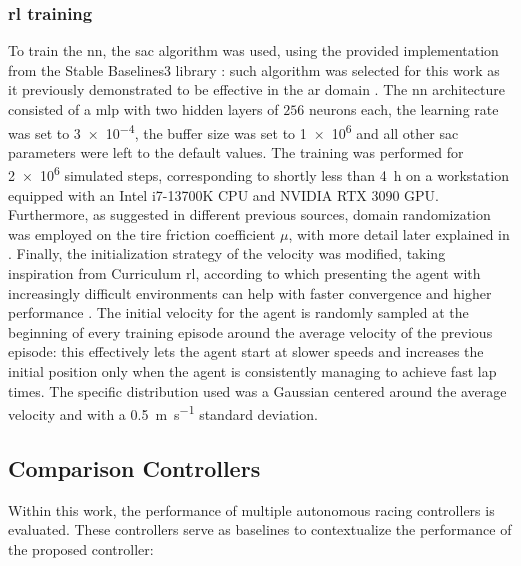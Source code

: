 \documentclass[letterpaper, conference]{IEEEtran}
\begin{document}
\subsubsection{\acrshort{rl} training}
To train the \gls{nn}, the \gls{sac} algorithm \cite{sac} was used, using the provided implementation from the Stable Baselines3 library \cite{stable-baselines3}: such algorithm was selected for this work as it previously demonstrated to be effective in the \gls{ar} domain \cite{chisari2021learning, Ghignone2023tcdriver}. 
The \gls{nn} architecture consisted of a \gls{mlp} with two hidden layers of $256$ neurons each, the learning rate was set to \num{3e-4}, the buffer size was set to \num{1e6} and all other \gls{sac} parameters were left to the default values. The training was performed for \num{2e6} simulated steps, corresponding to shortly less than \SI{4}{\hour} on a workstation equipped with an Intel i7-13700K CPU and NVIDIA RTX 3090 GPU. 
Furthermore, as suggested in different previous sources, domain randomization was employed on the tire friction coefficient $\mu$, with more detail later explained in .
Finally, the initialization strategy of the velocity was modified, taking inspiration from Curriculum \gls{rl}, according to which presenting the agent with increasingly difficult environments can help with faster convergence and higher performance \cite{song2021overtaking, rudin2022learning}.
The initial velocity for the agent is randomly sampled at the beginning of every training episode around the average velocity of the previous episode: this effectively lets the agent start at slower speeds and increases the initial position only when the agent is consistently managing to achieve fast lap times. The specific distribution used was a Gaussian centered around the average velocity and with a \qty{0.5}{\metre \per \second} standard deviation.



\subsection{Comparison Controllers}
Within this work, the performance of multiple autonomous racing controllers is evaluated. These controllers serve as baselines to contextualize the performance of the proposed {\namealgo} controller:
\end{document}
